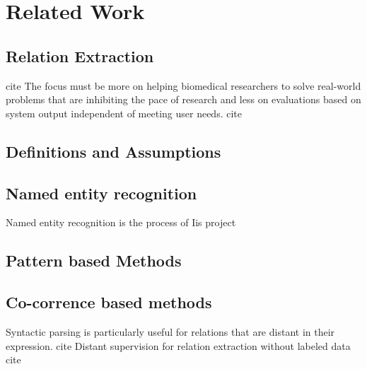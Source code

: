 \chapter{Related Work}  %

\ifpdf
    \graphicspath{{RelatedWork/Figs/Raster/}{RelatedWork/Figs/PDF/}{Introduction/Figs/}}
\else
    \graphicspath{{RelatedWork/Figs/Vector/}{RelatedWork/Figs/}}
\fi

\section{Relation Extraction} %
 cite The focus must be more on helping biomedical researchers to solve real-world problems that are inhibiting the pace of research and less on evaluations based on system output independent of meeting user needs. cite

\section{Definitions and Assumptions}


\section{Named entity recognition}
Named entity recognition is the process of 
Iis project 

\section{Pattern based Methods}

\section{Co-corrence based methods}
Syntactic parsing is particularly useful for relations that are distant in their expression. cite Distant supervision for relation extraction without labeled data cite

